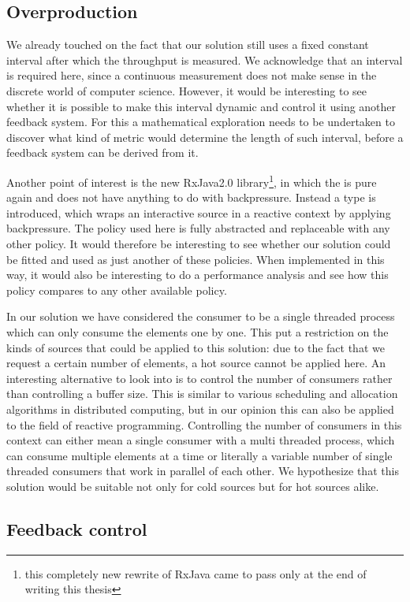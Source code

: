 \subsection*{Overproduction}
We already touched on the fact that our solution still uses a fixed constant interval after which the throughput is measured. We acknowledge that an interval is required here, since a continuous measurement does not make sense in the discrete world of computer science. However, it would be interesting to see whether it is possible to make this interval dynamic and control it using another feedback system. For this a mathematical exploration needs to be undertaken to discover what kind of metric would determine the length of such interval, before a feedback system can be derived from it.

Another point of interest is the new RxJava2.0 library\footnote{this completely new rewrite of RxJava came to pass only at the end of writing this thesis}, in which the \obs is pure again and does not have anything to do with backpressure. Instead a  type is introduced, which wraps an interactive source in a reactive context by applying backpressure. The policy used here is fully abstracted and replaceable with any other policy. It would therefore be interesting to see whether our solution could be fitted and used as just another of these policies. When implemented in this way, it would also be interesting to do a performance analysis and see how this policy compares to any other available policy.

In our solution we have considered the consumer to be a single threaded process which can only consume the elements one by one. This put a restriction on the kinds of sources that could be applied to this solution: due to the fact that we request a certain number of elements, a hot source cannot be applied here. An interesting alternative to look into is to control the number of consumers rather than controlling a buffer size. This is similar to various scheduling and allocation algorithms in distributed computing, but in our opinion this can also be applied to the field of reactive programming. Controlling the number of consumers in this context can either mean a single consumer with a multi threaded process, which can consume multiple elements at a time or literally a variable number of single threaded consumers that work in parallel of each other. We hypothesize that this solution would be suitable not only for cold sources but for hot sources alike.

\subsection*{Feedback control}



